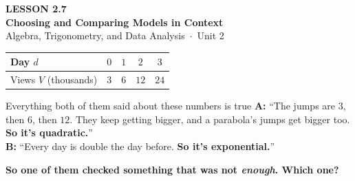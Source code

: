 \documentclass[aspectratio=169, 11pt]{beamer}
\begin{document}
{
\begin{frame}[plain]
  \vspace{2.8cm}\hspace{0.55cm}%
  \begin{minipage}{0.9\textwidth}
    {\color{goldacc}\bfseries\small LESSON 2.7}\\[0.5cm]
    {\color{white}\bfseries\LARGE Choosing and Comparing Models in Context}\\[1.2cm]
    {\color{mistmid}\small Algebra, Trigonometry, and Data Analysis~$\cdot$~Unit 2}
  \end{minipage}
\end{frame}
}

\begin{frame}[t, plain]
  \begin{center}
  \renewcommand{\arraystretch}{1.25}
  \begin{tabular}{@{}|l|c|c|c|c|@{}}
  \hline
  Day $d$ & $0$ & $1$ & $2$ & $3$ \\ \hline
  Views $V$ (thousands) & $3$ & $6$ & $12$ & $24$ \\
  \hline
  \end{tabular}
  \end{center}
  \begin{block}{Everything both of them said about these numbers is true}
    \small
    \textbf{A:} ``The jumps are $3$, then $6$, then $12$. They keep getting bigger, and a parabola's
    jumps get bigger too. \textbf{So it's quadratic.}''\\[0.15cm]
    \textbf{B:} ``Every day is double the day before. \textbf{So it's exponential.}''
  \end{block}
  \vspace{0.1cm}
  \textbf{So one of them checked something that was not \emph{enough}. Which one?}
\end{frame}
\end{document}
